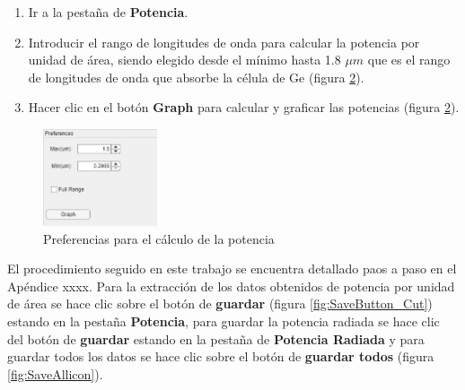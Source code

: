 \begin{enumerate}
\begin{figure}[H]
	\label{fig:indicadorLED}
	\end{figure}
	\item Ir a la pestaña de \textbf{Potencia}.
	\item Introducir el rango de longitudes de onda para calcular la potencia por unidad de área, siendo elegido desde el mínimo hasta 1.8 $\mu m$ que es el rango de longitudes de onda que absorbe la célula de Ge (figura \ref{fig:graficar_ejemplo2}).
	\item Hacer clic en el botón \textbf{Graph} para calcular y graficar las potencias (figura \ref{fig:graficar_ejemplo2}).
\end{enumerate}
\begin{figure}[H]
	\centering
	\includegraphics[width=0.30\textwidth]{figuras/Procedimiento_Simulaciones/Radiacion/graficar_ejemplo2.png}
	\caption{Preferencias para el cálculo de la potencia}
	\label{fig:graficar_ejemplo2}
\end{figure}
El procedimiento seguido en este trabajo se encuentra detallado paos a paso en el Apéndice xxxx. Para la extracción de los datos obtenidos de potencia por unidad de área se hace clic sobre el botón de \textbf{guardar} (figura \ref{fig:SaveButton_Cut}) estando en la pestaña \textbf{Potencia}, para guardar la potencia radiada se hace clic del botón de \textbf{guardar} estando en la pestaña de \textbf{Potencia Radiada} y para guardar todos los datos se hace clic sobre el botón de \textbf{guardar todos} (figura \ref{fig:SaveAllicon}).
